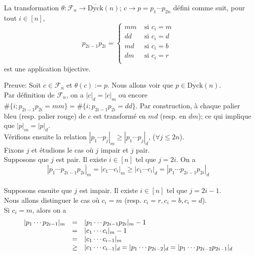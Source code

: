 \begin{proposition} \label{bij-DyckBar}
	La transformation $\theta: \mathcal{F}_{n} \longrightarrow  \overline{\text{Dyck}}(n)$; $c \longrightarrow p=p_{1}\cdots p_{2n}$ défini comme suit, pour tout $i \in [n]$,
	$$
		p_{2i-1}p_{2i}=\begin{cases}
			mm & \text{ si } c_{i}=m \\
			dd & \text{ si } c_{i}=d \\
			md & \text{ si } c_{i}=b \\
			dm & \text{ si } c_{i}=r \\
		\end{cases}
	$$
	est une application bijective.
\end{proposition}
Preuve: Soit $c\in \mathcal{F}_{n}$ et $\theta(c):=p$.
Nous allons voir que $p\in \overline{\text{Dyck}}(n) $.\\
Par définition de $\mathcal{F}_{n}$, on a $|c|_{d}=|c|_{m}$ ou encore $\#\{i; p_{2i-1}p_{2i}=mm\}=\#\{i; p_{2i-1}p_{2i}=dd\}$. Par construction, à chaque palier
bleu (resp. palier rouge) de $c$ est transformé en $md$ (resp. en $dm$); ce qui implique que $|p|_{m}=|p|_{d}$.\\
Vérifions ensuite la relation $|p_{1} \cdots p_{j}|_{m}\geq |p_{1} \cdots p_{j}|_{d}$, ($\forall j\leq 2n$).\\
Fixons $j$ et étudions le cas où $j$ impair et $j$ pair. \\
Supposons que $j$ est pair. Il existe $i\in [n]$ tel que $j=2i$. On a \vspace{5pt}\\
\[
	|p_{1} \cdots p_{2i-1}p_{2i}|_{m} = |c_{1} \cdots c_{i}|_{m}\geq |c_{1} \cdots c_{i}|_{d} = |p_{1} \cdots p_{2i-1}p_{2i}|_{d}
\]
\text{}\vspace{5pt}\\
Supposons ensuite que $j$ est impair. Il existe $i\in [n]$ tel que $j = 2i-1$.\\ Nous allons distinguer le cas où $c_{i} = m$ (resp. $c_{i}=r, c_{i}=b, c_{i}=d$).\\
Si $c_{i}=m$, alors on a \vspace{5pt}\\
\[
	\begin{array} {l l l}
		| p_{1}\cdots p_{2i-1} |_{m} & =    & | p_{1}\cdots p_{2i-1}p_{2i} |_{m} -1                                                           \\
		                             & =    & | c_{1}\cdots c_{i} |_{m} -1                                                                    \\
		                             & =    & | c_{1}\cdots c_{i-1} |_{m}                                                                     \\
		                             & \geq & | c_{1}\cdots c_{i-1} |_{d} =| p_{1}\cdots p_{2i-2} |_{d} =| p_{1}\cdots p_{2i-2}p_{2i-1} |_{d} \\
	\end{array}
\]
